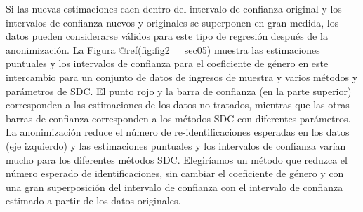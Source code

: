 \documentclass[]{book}
\newenvironment{Shaded}{\begin{snugshade}}{\end{snugshade}}
\newcommand{\CommentTok}[1]{\textcolor[rgb]{0.56,0.35,0.01}{\textit{#1}}}
\newcommand{\DataTypeTok}[1]{\textcolor[rgb]{0.13,0.29,0.53}{#1}}
\newcommand{\FloatTok}[1]{\textcolor[rgb]{0.00,0.00,0.81}{#1}}
\newcommand{\KeywordTok}[1]{\textcolor[rgb]{0.13,0.29,0.53}{\textbf{#1}}}
\newcommand{\NormalTok}[1]{#1}
\newcommand{\OperatorTok}[1]{\textcolor[rgb]{0.81,0.36,0.00}{\textbf{#1}}}
\theoremstyle{definition}
\theoremstyle{definition}
\theoremstyle{definition}
\theoremstyle{definition}
\theoremstyle{remark}
\begin{document}
\begin{Shaded}
\end{Shaded}

Si las nuevas estimaciones caen dentro del intervalo de confianza original y los intervalos de confianza nuevos y originales se superponen en gran medida, los datos pueden considerarse válidos para este tipo de regresión después de la anonimización. La Figura @ref(fig:fig2\_\_sec05) muestra las estimaciones puntuales y los intervalos de confianza para el coeficiente de género en este intercambio para un conjunto de datos de ingresos de muestra y varios métodos y parámetros de SDC. El punto rojo y la barra de confianza (en la parte superior) corresponden a las estimaciones de los datos no tratados, mientras que las otras barras de confianza corresponden a los métodos SDC con diferentes parámetros. La anonimización reduce el número de re-identificaciones esperadas en los datos (eje izquierdo) y las estimaciones puntuales y los intervalos de confianza varían mucho para los diferentes métodos SDC. Elegiríamos un método que reduzca el número esperado de identificaciones, sin cambiar el coeficiente de género y con una gran superposición del intervalo de confianza con el intervalo de confianza estimado a partir de los datos originales.
\end{document}
